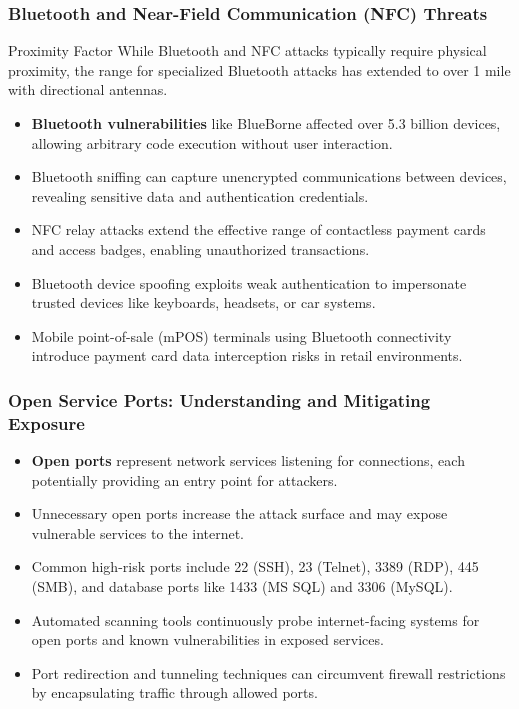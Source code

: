 \documentclass{beamer}
\begin{document}
\begin{frame}
    \frametitle{Bluetooth and Near-Field Communication (NFC) Threats}
    
    \begin{alertblock}{Proximity Factor}
        While Bluetooth and NFC attacks typically require physical proximity, the range for specialized Bluetooth attacks has extended to over 1 mile with directional antennas.
    \end{alertblock}
    
    \begin{itemize}
        \item \textbf{Bluetooth vulnerabilities} like BlueBorne affected over 5.3 billion devices, allowing arbitrary code execution without user interaction.
        \item Bluetooth sniffing can capture unencrypted communications between devices, revealing sensitive data and authentication credentials.
        \item NFC relay attacks extend the effective range of contactless payment cards and access badges, enabling unauthorized transactions.
        \item Bluetooth device spoofing exploits weak authentication to impersonate trusted devices like keyboards, headsets, or car systems.
        \item Mobile point-of-sale (mPOS) terminals using Bluetooth connectivity introduce payment card data interception risks in retail environments.
    \end{itemize}
\end{frame}

\begin{frame}
    \frametitle{Open Service Ports: Understanding and Mitigating Exposure}
    
    \begin{itemize}
        \item \textbf{Open ports} represent network services listening for connections, each potentially providing an entry point for attackers.
        \item Unnecessary open ports increase the attack surface and may expose vulnerable services to the internet.
        \item Common high-risk ports include 22 (SSH), 23 (Telnet), 3389 (RDP), 445 (SMB), and database ports like 1433 (MS SQL) and 3306 (MySQL).
        \item Automated scanning tools continuously probe internet-facing systems for open ports and known vulnerabilities in exposed services.
        \item Port redirection and tunneling techniques can circumvent firewall restrictions by encapsulating traffic through allowed ports.
    \end{itemize}
\end{frame}
\end{document}
